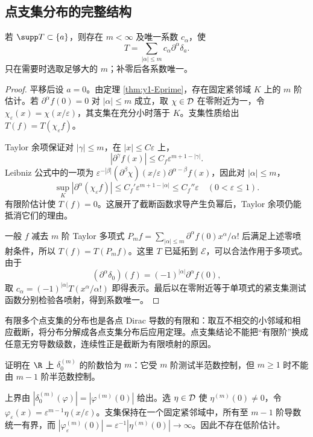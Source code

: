 \subsection{点支集分布的完整结构}
\begin{theorem}\label{thm:y1-point-support}
若 $\supp T\subset\{a\}$，则存在 $m<\infty$ 及唯一系数 $c_\alpha$，使
\[
 T=\sum_{|\alpha|\le m}c_\alpha\partial^\alpha\delta_a.
\]
只在需要时选取足够大的 $m$；补零后各系数唯一。
\end{theorem}
\begin{proof}
平移后设 $a=0$。由定理 \ref{thm:y1-Eprime}，存在固定紧邻域 $K$ 上的 $m$ 阶估计。若 $\partial^\alpha f(0)=0$ 对 $|\alpha|\le m$ 成立，取 $\chi\in\mathcal{D}$ 在零附近为一，令 $\chi_\varepsilon(x)=\chi(x/\varepsilon)$，其支集在充分小时落于 $K$。支集性质给出 $T(f)=T(\chi_\varepsilon f)$。

Taylor 余项保证对 $|\gamma|\le m$，在 $|x|\le C\varepsilon$ 上，
\[
 |\partial^\gamma f(x)|\le C_f\varepsilon^{m+1-|\gamma|}.
\]
Leibniz 公式中的一项为 $\varepsilon^{-|\beta|}(\partial^\beta\chi)(x/\varepsilon)\partial^{\alpha-\beta}f(x)$，因此对 $|\alpha|\le m$，
\[
 \sup_K|\partial^\alpha(\chi_\varepsilon f)|
 \le C_f'\varepsilon^{m+1-|\alpha|}\le C_f''\varepsilon
 \quad(0<\varepsilon\le1).
\]
有限阶估计使 $T(f)=0$。这展开了截断函数求导产生负幂后，Taylor 余项仍能抵消它们的理由。

一般 $f$ 减去 $m$ 阶 Taylor 多项式 $P_mf=\sum_{|\alpha|\le m}\partial^\alpha f(0)x^\alpha/\alpha!$ 后满足上述零喷射条件，所以 $T(f)=T(P_mf)$。这里 $T$ 已延拓到 $\mathcal E$，可以合法作用于多项式。由于
\[
 (\partial^\alpha\delta_0)(f)=(-1)^{|\alpha|}\partial^\alpha f(0),
\]
取 $c_\alpha=(-1)^{|\alpha|}T(x^\alpha/\alpha!)$ 即得表示。最后以在零附近等于单项式的紧支集测试函数分别检验各喷射，得到系数唯一。
\end{proof}
有限多个点支集的分布也是各点 Dirac 导数的有限和：取互不相交的小邻域和相应截断，将分布分解成各点支集分布后应用定理。点支集结论不能把“有限阶”换成任意无穷导数级数，连续性正是截断为有限喷射的原因。

\begin{exercise}[补充：点支集分布的阶数]
证明在 $\R$ 上 $\delta_0^{(m)}$ 的阶数恰为 $m$：它受 $m$ 阶测试半范数控制，但 $m\ge1$ 时不能由 $m-1$ 阶半范数控制。
\end{exercise}
\begin{solution}
上界由 $|\delta_0^{(m)}(\varphi)|=|\varphi^{(m)}(0)|$ 给出。选 $\eta\in\mathcal{D}$ 使 $\eta^{(m)}(0)\ne0$，令 $\varphi_\varepsilon(x)=\varepsilon^{m-1}\eta(x/\varepsilon)$。支集保持在一个固定紧邻域中，所有至 $m-1$ 阶导数统一有界，而 $|\varphi_\varepsilon^{(m)}(0)|=\varepsilon^{-1}|\eta^{(m)}(0)|\to\infty$。因此不存在低阶估计。
\end{solution}
